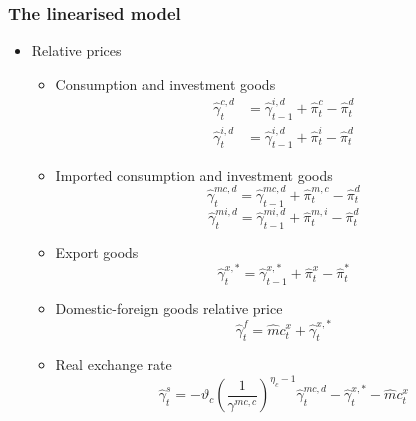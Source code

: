 \documentclass[9pt]{beamer}
\begin{document}
\begin{frame}[noframenumbering]
\begin{itemize}
\begin{itemize}
    \end{itemize}

    
\end{itemize}
    
\end{frame}
\begin{frame}[noframenumbering]
\frametitle{The linearised model}
\begin{itemize}

\item Relative prices
    \begin{itemize}
    \item Consumption and investment goods
    $$
    \begin{aligned}
    \hat{\gamma}_{t}^{c, d} &=\hat{\gamma}_{t-1}^{i, d}+\hat{\pi}_{t}^{c}-\hat{\pi}_{t}^{d} \\
    \hat{\gamma}_{t}^{i, d} &=\hat{\gamma}_{t-1}^{i, d}+\hat{\pi}_{t}^{i}-\hat{\pi}_{t}^{d}
    \end{aligned}
    $$
    
    \item Imported consumption and investment goods
    $$
    \hat{\gamma}_{t}^{m c, d}=\hat{\gamma}_{t-1}^{m c, d}+\hat{\pi}_{t}^{m, c}-\hat{\pi}_{t}^{d}
    $$
    $$
    \hat{\gamma}_{t}^{m i, d}=\hat{\gamma}_{t-1}^{m i, d}+\hat{\pi}_{t}^{m, i}-\hat{\pi}_{t}^{d}
    $$
    
    \item Export goods
    $$
    \hat{\gamma}_{t}^{x, *}=\hat{\gamma}_{t-1}^{x, *}+\hat{\pi}_{t}^{x}-\hat{\pi}_{t}^{*}
    $$
    
    \item Domestic-foreign goods relative price
    $$
    \hat{\gamma}_{t}^{f}=\hat{m} c_{t}^{x}+\hat{\gamma}_{t}^{x, *}
    $$
    
    \item Real exchange rate
    $$
    \hat{\gamma}_{t}^{s}=-\vartheta_{c}\left(\frac{1}{\gamma^{m c, c}}\right)^{\eta_{c}-1} \hat{\gamma}_{t}^{m c, d}-\hat{\gamma}_{t}^{x, *}-\hat{m} c_{t}^{x}
    $$
    
    \end{itemize}
\end{itemize}

\end{frame}









%
%

%
%
\end{document}
